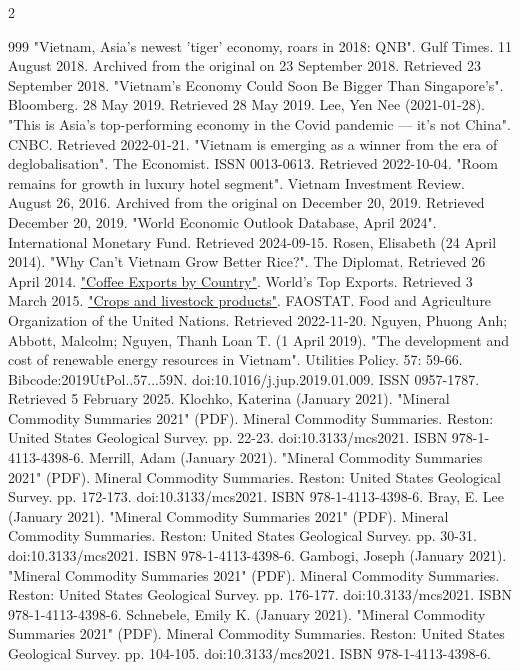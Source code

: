 \documentclass[openany]{book}
\begin{document}
\begin{multicols}{2}
\begin{thebibliography}{999}
 "Vietnam, Asia's newest 'tiger' economy, roars in 2018: QNB". Gulf Times. 11 August 2018. Archived from the original on 23 September 2018. Retrieved 23 September 2018.
 "Vietnam's Economy Could Soon Be Bigger Than Singapore's". Bloomberg. 28 May 2019. Retrieved 28 May 2019.
 Lee, Yen Nee (2021-01-28). "This is Asia's top-performing economy in the Covid pandemic — it's not China". CNBC. Retrieved 2022-01-21.
 "Vietnam is emerging as a winner from the era of deglobalisation". The Economist. ISSN 0013-0613. Retrieved 2022-10-04.
 "Room remains for growth in luxury hotel segment". Vietnam Investment Review. August 26, 2016. Archived from the original on December 20, 2019. Retrieved December 20, 2019.
 "World Economic Outlook Database, April 2024". International Monetary Fund. Retrieved 2024-09-15.
 Rosen, Elisabeth (24 April 2014). "Why Can't Vietnam Grow Better Rice?". The Diplomat. Retrieved 26 April 2014.
 \href{http://www.worldstopexports.com/coffee-exports-country/}{"Coffee Exports by Country"}. World's Top Exports. Retrieved 3 March 2015.
 \href{https://www.fao.org/faostat/en/#data/QCL}{"Crops and livestock products"}. FAOSTAT. Food and Agriculture Organization of the United Nations. Retrieved 2022-11-20.
 Nguyen, Phuong Anh; Abbott, Malcolm; Nguyen, Thanh Loan T. (1 April 2019). "The development and cost of renewable energy resources in Vietnam". Utilities Policy. 57: 59-66. Bibcode:2019UtPol..57...59N. doi:10.1016/j.jup.2019.01.009. ISSN 0957-1787. Retrieved 5 February 2025.
 Klochko, Katerina (January 2021). "Mineral Commodity Summaries 2021" (PDF). Mineral Commodity Summaries. Reston: United States Geological Survey. pp. 22-23. doi:10.3133/mcs2021. ISBN 978-1-4113-4398-6.
 Merrill, Adam (January 2021). "Mineral Commodity Summaries 2021" (PDF). Mineral Commodity Summaries. Reston: United States Geological Survey. pp. 172-173. doi:10.3133/mcs2021. ISBN 978-1-4113-4398-6.
 Bray, E. Lee (January 2021). "Mineral Commodity Summaries 2021" (PDF). Mineral Commodity Summaries. Reston: United States Geological Survey. pp. 30-31. doi:10.3133/mcs2021. ISBN 978-1-4113-4398-6.
 Gambogi, Joseph (January 2021). "Mineral Commodity Summaries 2021" (PDF). Mineral Commodity Summaries. Reston: United States Geological Survey. pp. 176-177. doi:10.3133/mcs2021. ISBN 978-1-4113-4398-6.
 Schnebele, Emily K. (January 2021). "Mineral Commodity Summaries 2021" (PDF). Mineral Commodity Summaries. Reston: United States Geological Survey. pp. 104-105. doi:10.3133/mcs2021. ISBN 978-1-4113-4398-6.

\end{thebibliography}
\end{multicols}
\end{document}
